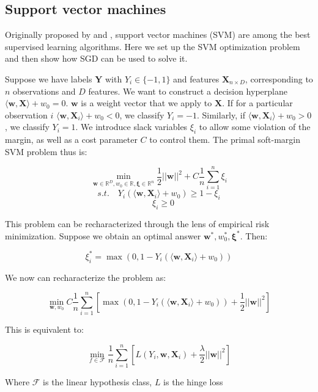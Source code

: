 \documentclass{report}
\begin{document}
\subsection{Support vector machines}

Originally proposed by \cite{boser1992training} and \cite{cortes1995support}, support vector machines (SVM)
are among the best supervised learning algorithms. Here we set up the SVM
optimization
problem and then show how SGD can be used to solve it.

Suppose we have labels $\bm{Y}$ with $Y_i \in \{-1,1\}$ and features $\bm{X}_{n
\times D}$, corresponding to $n$ observations and $D$ features.
We want to construct a decision hyperplane 
$\langle \bm{w}, \bm{X} \rangle + w_0= 0$. $\bm{w}$ is
a weight vector that we apply to $\bm{X}$. If for a particular observation $i$
$\langle \bm{w}, \bm{X}_i \rangle + w_0 < 0$, we
classify $Y_i=-1$. Similarly, if $\langle \bm{w}, \bm{X}_i \rangle + w_0 > 0$, we
classify $Y_i = 1$. We introduce slack variables $\xi_i$ to allow some
violation of the margin, as well as a cost parameter $C$ to control them. The
primal soft-margin SVM problem thus is:

\begin{equation}
	\min_{\bm{w} \in \mathbb{R}^D, w_0 \in \mathbb{R}, \bm{\xi} \in \mathbb{R}^n} 
	\frac{1}{2} ||\bm{w}||^2 + C \frac{1}{n} \sum_{i=1}^n \xi_i
\end{equation}
$$
s.t. \quad Y_i(\langle \bm{w}, \bm{X}_i \rangle + w_0) \geq 1 - \xi_i 
$$
$$
\quad \xi_i \geq 0 
$$

This problem can be recharacterized through the lens of empirical risk
minimization. Suppose we obtain an optimal answer $\bm{w}^*, w_0^*, \bm{\xi}^*$. 
Then:

$$
\xi_i^* = \max(0, 1 - Y_i(\langle \bm{w}, \bm{X}_i \rangle + w_0)) 
$$

We now can recharacterize the problem as:

$$
\min_{\bm{w}, w_0} C \frac{1}{n} \sum_{i=1}^n \left[ \max(0, 1 - Y_i(\langle \bm{w},
\bm{X}_i \rangle +
w_0)) + \frac{1}{2}||\bm{w}||^2 \right]
$$

This is equivalent to:

\begin{equation}
\min_{f \in \mathcal{F}} \frac{1}{n} \sum_{i=1}^n \left[ L(Y_i, \bm{w},
	\bm{X}_i) + \frac{\lambda}{2}
||\bm{w}||^2 \right]
\end{equation}

Where $\mathcal{F}$ is the linear hypothesis class, $L$ is the hinge loss
\end{document}
